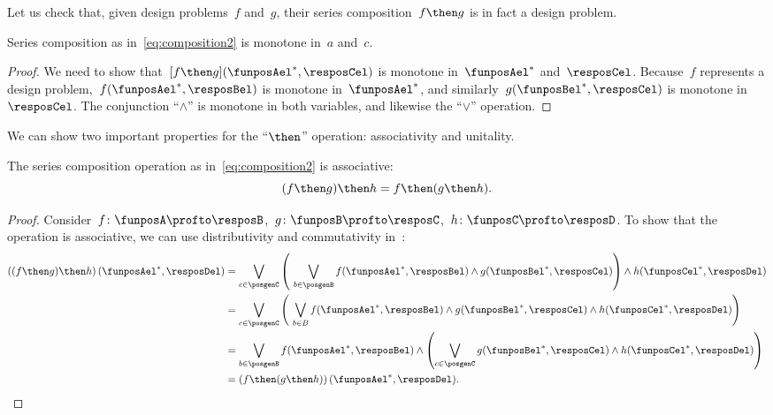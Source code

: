 Let us check that, given design problems~$f$ and~$g$, their series composition~$f\then g$ is in fact a design problem.
\begin{lemma}
  Series composition as in~\cref{eq:composition2} is monotone in~$a$ and~$c$.
\end{lemma}
\begin{proof}
  We need to show that~$[f\then g](\funposAel^*,\resposCel)$ is monotone in~$\funposAel^*$ and~$\resposCel$. Because~$f$ represents a design problem,~$f(\funposAel^*,\resposBel)$ is monotone in~$\funposAel^*$, and similarly~$g(\funposBel^*,\resposCel)$ is monotone in~$\resposCel$. The conjunction ``$\wedge$'' is monotone in both variables, and likewise the ``$\vee$'' operation.
\end{proof}

We can show two important properties for the ``$\then$'' operation: associativity and unitality.
\begin{lemma}
  The series composition operation as in~\cref{eq:composition2} is associative:
  \begin{equation}
  (f\then g)
    \then h = f\then (g\then h).
  \end{equation}
\end{lemma}

\begin{proof}
  Consider~$f\colon \funposA\profto \resposB$,~$g\colon \funposB \profto \resposC$,~$h\colon \funposC\profto \resposD$.
  To show that the operation is associative, we can use distributivity and commutativity in~\Bool:
%
  \begin{equation}
    \begin{aligned}
      \left((f\then g) \then h\right) (\funposAel^*,\resposDel)
      &= \bigvee_{c \in \posgenC} \left (\ \bigvee_{b\in \posgenB} f(\funposAel^*,\resposBel) \wedge g(\funposBel^*,\resposCel) \right )  \wedge  h (\funposCel^*, \resposDel) \\
      &= \bigvee_{c \in \posgenC} \left (\ \bigvee_{b\in B } f(\funposAel^*,\resposBel)
      \wedge g(\funposBel^*,\resposCel) \wedge h (\funposCel^*, \resposDel)
      \right ) \\
      &= \bigvee_{b \in \posgenB } f(\funposAel^*,\resposBel) \wedge \left ( \bigvee_{c\in \posgenC} g(\funposBel^*,\resposCel) \wedge h (\funposCel^*, \resposDel) \right ) \\
      &= \left(f \then (g \then h )\right) (\funposAel^*, \resposDel).
    \end{aligned}
  \end{equation}
%
\end{proof}

